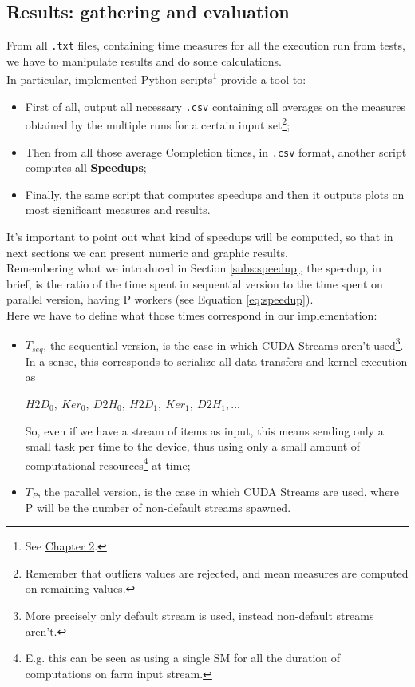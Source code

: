 \subsection{Results: gathering and evaluation}
\label{subs:resgath}
From all \texttt{.txt} files, containing time measures for all the execution run from tests, we have to manipulate results and do some calculations.\\
In particular, implemented Python scripts\footnote{See \hyperref[chap:tools]{Chapter 2}.} provide a tool to:
\begin{itemize}
	\item First of all, output all necessary \texttt{.csv} containing all averages on the measures obtained by the multiple runs for a certain input set\footnote{Remember that outliers values are rejected, and mean measures are computed on remaining values.};
	\item Then from all those average Completion times, in \texttt{.csv} format, another script computes all \textbf{Speedups};
	\item Finally, the same script that computes speedups and then it outputs plots on most significant measures and results.\\
\end{itemize}
It's important to point out what kind of speedups will be computed, so that in next sections we can present numeric and graphic results.\\
Remembering what we introduced in Section \ref{subs:speedup}, the speedup, in brief, is the ratio of the time spent in sequential version to the time spent on parallel version, having P workers (see Equation \ref{eq:speedup}).\\
Here we have to define what those times correspond in our implementation:
\begin{itemize}
	\item \(T_{seq}\), the sequential version, is the case in which CUDA Streams aren't used\footnote{More precisely only default stream is used, instead non-default streams aren't.}. In a sense, this corresponds to serialize all data transfers and kernel execution as
	\begin{center}
		\(H2D_{0},\ Ker_{0},\ D2H_{0},\ H2D_{1},\ Ker_{1},\ D2H_{1}, . . .\)
	\end{center}
	So, even if we have a stream of items as input, this means sending only a small task per time to the device, thus using only a small amount of computational resources\footnote{E.g. this can be seen as using a single SM for all the duration of computations on farm input stream.} at time;
	\item \(T_{P}\), the parallel version, is the case in which CUDA Streams are used, where P will be the number of non-default streams spawned.
\end{itemize}
